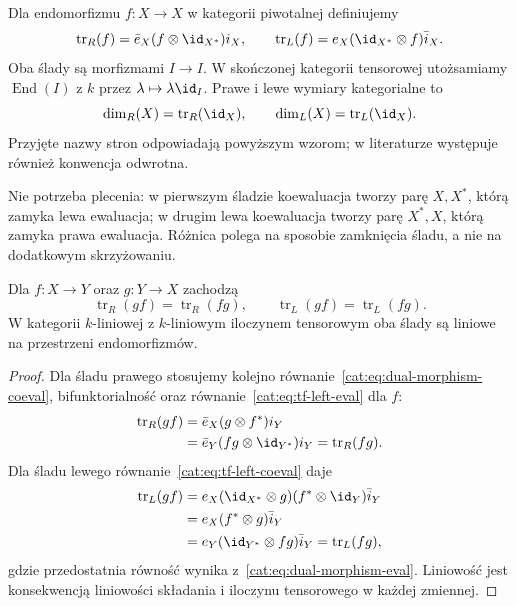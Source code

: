 \begin{definicja}\label{cat:def:tf-pivotal-traces}
Dla endomorfizmu $f:X\to X$ w kategorii piwotalnej definiujemy
\[
 \operatorname{tr}_R(f)=\bar e_X(f\otimes\id_{X^*})i_X,
 \qquad
 \operatorname{tr}_L(f)=e_X(\id_{X^*}\otimes f)\bar i_X.
\]
Oba ślady są morfizmami $I\to I$. W skończonej kategorii tensorowej utożsamiamy $\operatorname{End}(I)$ z $k$ przez $\lambda\mapsto\lambda\id_I$. Prawe i lewe wymiary kategorialne to
\[
 \dim_R(X)=\operatorname{tr}_R(\id_X),
 \qquad \dim_L(X)=\operatorname{tr}_L(\id_X).
\]
Przyjęte nazwy stron odpowiadają powyższym wzorom; w literaturze występuje również konwencja odwrotna.
\end{definicja}

Nie potrzeba plecenia: w pierwszym śladzie koewaluacja tworzy parę $X,X^*$, którą zamyka lewa ewaluacja; w drugim lewa koewaluacja tworzy parę $X^*,X$, którą zamyka prawa ewaluacja. Różnica polega na sposobie zamknięcia śladu, a nie na dodatkowym skrzyżowaniu.

\begin{stwierdzenie}\label{cat:prop:tf-pivotal-cyclicity}
Dla $f:X\to Y$ oraz $g:Y\to X$ zachodzą
\[
 \operatorname{tr}_R(gf)=\operatorname{tr}_R(fg),
 \qquad
 \operatorname{tr}_L(gf)=\operatorname{tr}_L(fg).
\]
W kategorii $k$-liniowej z $k$-liniowym iloczynem tensorowym oba ślady są liniowe na przestrzeni endomorfizmów.
\end{stwierdzenie}
\begin{proof}
Dla śladu prawego stosujemy kolejno równanie~\eqref{cat:eq:dual-morphism-coeval}, bifunktorialność oraz równanie~\eqref{cat:eq:tf-left-eval} dla $f$:
\[
\begin{aligned}
 \operatorname{tr}_R(gf)
 &=\bar e_X(g\otimes f^*)i_Y\\
 &=\bar e_Y(fg\otimes\id_{Y^*})i_Y
 =\operatorname{tr}_R(fg).
\end{aligned}
\]
Dla śladu lewego równanie~\eqref{cat:eq:tf-left-coeval} daje
\[
\begin{aligned}
 \operatorname{tr}_L(gf)
 &=e_X(\id_{X^*}\otimes g)(f^*\otimes\id_Y)\bar i_Y\\
 &=e_X(f^*\otimes g)\bar i_Y\\
 &=e_Y(\id_{Y^*}\otimes fg)\bar i_Y
 =\operatorname{tr}_L(fg),
\end{aligned}
\]
gdzie przedostatnia równość wynika z~\eqref{cat:eq:dual-morphism-eval}. Liniowość jest konsekwencją liniowości składania i iloczynu tensorowego w każdej zmiennej.
\end{proof}

